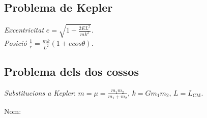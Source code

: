 \documentclass[10pt]{article}
\newcommand{\lp}{\left(}
\newcommand{\rp}{\right)}
\begin{document}
\begin{multicols}{3}
\subsection{Problema de Kepler}
\emph{Excentricitat} $e = \sqrt{1 + \frac{2EL^2}{mk^2}}$.\\
\emph{Posició} $\frac{1}{r} = \frac{mk}{L^2} \lp 1 + e cos \theta \rp$.

\subsection{Problema dels dos cossos}
\emph{Substitucions a Kepler}: $m = \mu = \frac{m_1m_2}{m_1+m_2},\, k = Gm_1m_2, \, L = L_\text{CM}$.

\ifland
\noindent\makebox[\linewidth]{\rule{\linewidth}{0.5pt}}
\vspace{3pt}
\raggedleft
{\large Nom: \underline{\hspace{5cm}}}


\end{multicols}

\fi
\end{document}
